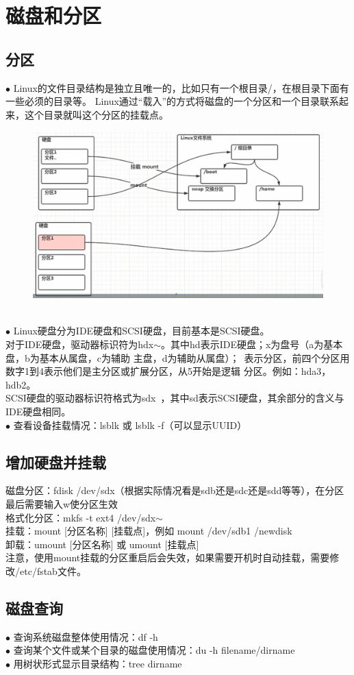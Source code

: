 \documentclass[11pt]{article}
\begin{document}
\section{磁盘和分区}
\subsection{分区}
$\bullet$ Linux的文件目录结构是独立且唯一的，比如只有一个根目录/，在根目录下面有一些必须的目录等。
Linux通过“载入”的方式将磁盘的一个分区和一个目录联系起来，这个目录就叫这个分区的挂载点。 \\
\begin{figure}[htb]
    \centering
    \includegraphics[scale=0.27]{imgs/parts.png}
\end{figure} \\
$\bullet$ Linux硬盘分为IDE硬盘和SCSI硬盘，目前基本是SCSI硬盘。 \\
对于IDE硬盘，驱动器标识符为hdx$\sim$。其中hd表示IDE硬盘；x为盘号（a为基本盘，b为基本从属盘，c为辅助
主盘，d为辅助从属盘）；~表示分区，前四个分区用数字1到4表示他们是主分区或扩展分区，从5开始是逻辑
分区。例如：hda3，hdb2。\\
SCSI硬盘的驱动器标识符格式为sdx~，其中sd表示SCSI硬盘，其余部分的含义与IDE硬盘相同。
\\
$\bullet$ 查看设备挂载情况：lsblk 或 lsblk -f（可以显示UUID）

\subsection{增加硬盘并挂载}
磁盘分区：fdisk /dev/sdx（根据实际情况看是sdb还是sdc还是sdd等等），在分区最后需要输入w使分区生效  \\
格式化分区：mkfs -t ext4 /dev/sdx$\sim$  \\
挂载：mount [分区名称] [挂载点]，例如 mount /dev/sdb1 /newdisk  \\
卸载：umount [分区名称] 或 umount [挂载点]  \\
注意，使用mount挂载的分区重启后会失效，如果需要开机时自动挂载，需要修改/etc/fstab文件。

\subsection{磁盘查询}
$\bullet$ 查询系统磁盘整体使用情况：df -h  \\
$\bullet$ 查询某个文件或某个目录的磁盘使用情况：du -h filename/dirname  \\
$\bullet$ 用树状形式显示目录结构：tree dirname









    
\end{document}

